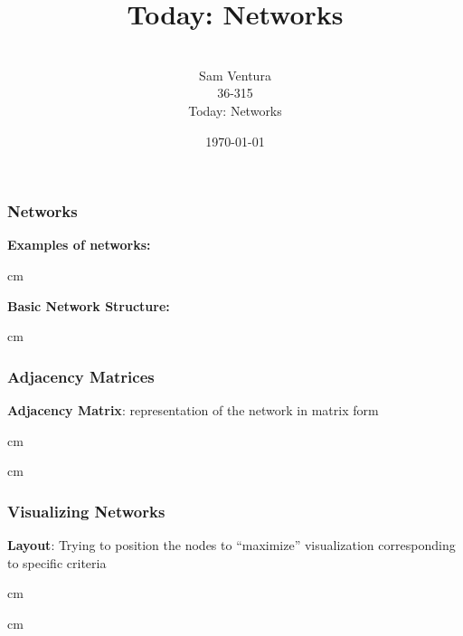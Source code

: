 \documentclass{beamer} %
\begin{document}
\title[dedup]{Today:  Networks}


\author[Samuel L. Ventura]{\\
  \large{Sam Ventura\\36-315\\Today:  Networks}}
\date{\today}


\begin{frame}
	\maketitle

	
\end{frame}



\begin{frame}\frametitle{Networks}
	\small
	
	\textbf{Examples of networks:}
	
	 cm
	
	\textbf{Basic Network Structure:}
	
	 cm
	
\end{frame}




\begin{frame}\frametitle{Adjacency Matrices}
	\small
	
	\textbf{Adjacency Matrix}:  representation of the network in matrix form
	
	 cm
	
	 cm
	
\end{frame}




\begin{frame}\frametitle{Visualizing Networks}
	\small
	
	\textbf{Layout}:  Trying to position the nodes to ``maximize'' visualization corresponding to specific criteria
	
	 cm
	
	
	 cm
	
\end{frame}
\end{document}
